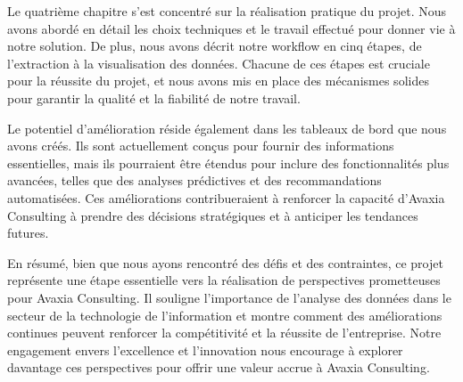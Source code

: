 \par Le quatrième chapitre s'est concentré sur la réalisation pratique du projet. Nous avons abordé en détail les choix techniques et le travail effectué pour donner vie à notre solution. De plus, nous avons décrit notre workflow en cinq étapes, de l'extraction à la visualisation des données. Chacune de ces étapes est cruciale pour la réussite du projet, et nous avons mis en place des mécanismes solides pour garantir la qualité et la fiabilité de notre travail.
\par Le potentiel d'amélioration réside également dans les tableaux de bord que nous avons créés. Ils sont actuellement conçus pour fournir des informations essentielles, mais ils pourraient être étendus pour inclure des fonctionnalités plus avancées, telles que des analyses prédictives et des recommandations automatisées. Ces améliorations contribueraient à renforcer la capacité d'Avaxia Consulting à prendre des décisions stratégiques et à anticiper les tendances futures.

\par En résumé, bien que nous ayons rencontré des défis et des contraintes, ce projet représente une étape essentielle vers la réalisation de perspectives prometteuses pour Avaxia Consulting. Il souligne l'importance de l'analyse des données dans le secteur de la technologie de l'information et montre comment des améliorations continues peuvent renforcer la compétitivité et la réussite de l'entreprise. Notre engagement envers l'excellence et l'innovation nous encourage à explorer davantage ces perspectives pour offrir une valeur accrue à Avaxia Consulting.


